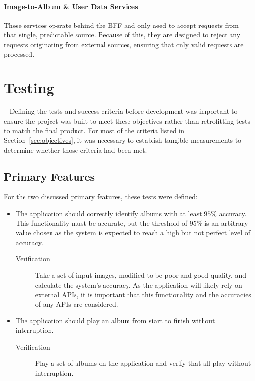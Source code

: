 \paragraph{Image-to-Album \& User Data Services} These services operate behind the BFF and only need to accept requests from that single, predictable source. Because of this, they are designed to reject any requests originating from external sources, ensuring that only valid requests are processed.

\section{Testing}~\label{sec:test-design}
Defining the tests and success criteria before development was important to ensure the project was built to meet these objectives rather than retrofitting tests to match the final product. For most of the criteria listed in Section~\ref{sec:objectives}, it was necessary to establish tangible measurements to determine whether those criteria had been met.

\subsection{Primary Features}
For the two discussed primary features, these tests were defined:
\begin{itemize}
    \item The application should correctly identify albums with at least $95\%$ accuracy. This functionality must be accurate, but the threshold of $95\%$ is an arbitrary value chosen as the system is expected to reach a high but not perfect level of accuracy.
    \begin{description}
        \item[Verification:] Take a set of input images, modified to be poor and good quality, and calculate the system's accuracy. As the application will likely rely on external APIs, it is important that this functionality and the accuracies of any APIs are considered.
    \end{description}
    \item The application should play an album from start to finish without interruption.
    \begin{description}
        \item[Verification:] Play a set of albums on the application and verify that all play without interruption.
    \end{description}
\end{itemize}

